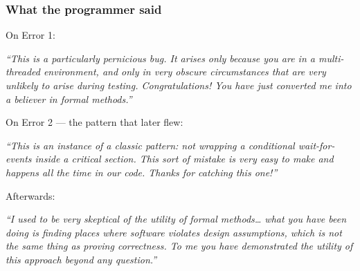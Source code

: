 \begin{frame}
  \frametitle{What the programmer said} \small

On Error 1:

\begin{block}{}\small
{\em ``This is a particularly pernicious bug. It arises only because you are in a
multi-threaded environment, and only in very obscure circumstances that are very
unlikely to arise during testing. Congratulations! You have just converted me into
a believer in formal methods.''}
\end{block}

\pause

On Error 2 --- the pattern that later flew:

\begin{block}{}\small
{\em ``This is an instance of a classic pattern: not wrapping a conditional
wait-for-events inside a critical section. This sort of mistake is very easy to
make and happens all the time in our code. Thanks for catching this one!''}
\end{block}

\pause

Afterwards:

\begin{block}{}\small
{\em ``I used to be very skeptical of the utility of formal methods\dots{} what you
have been doing is finding places where software violates design assumptions,
which is not the same thing as proving correctness. To me you have demonstrated
the utility of this approach beyond any question.''}
\end{block}

\end{frame}
